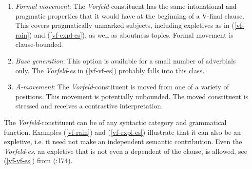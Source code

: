\documentclass[output=paper]{langsci/langscibook}
\begin{document}
\begin{enumerate}
\item \textit{Formal movement}: The \textit{Vorfeld}-constituent has the same intonational and pragmatic properties that it would have at the beginning of a V-final clause. This covers pragmatically unmarked subjects, including expletives as in (\ref{vf-rain}) and (\ref{vf-expl-es}), as well as aboutness topics. Formal movement is clause-bounded.

\item \textit{Base generation}: This option is available for a small number of adverbials only. The \textit{Vorfeld}-\textit{es} in (\ref{vf-vf-es}) probably falls into this class.

\item \textit{Ā-movement}: The \textit{Vorfeld}-constituent is moved from one of a variety of positions. This movement is potentially unbounded. The moved constituent is stressed and receives a contrastive interpretation.
\end{enumerate}

The \textit{Vorfeld}-constituent can be of any syntactic category and grammatical function. Examples (\ref{vf-rain}) and (\ref{vf-expl-es}) illustrate that it can also be an expletive, i.e. it need not make an independent semantic contribution. Even the \textit{Vorfeld}-\textit{es}, an expletive that is not even a dependent of the clause, is allowed, see (\ref{vf-vf-es}) from \citeauthor{Mueller:13} (\citeyear{Mueller:13}:174).

\begin{exe}\label{vf-expletive}
\ex
\begin{xlist}
\ex
\begin{xlist}\label{vf-vf-es}
\end{xlist}
\end{xlist}
\end{exe}
\end{document}
